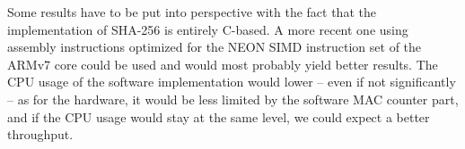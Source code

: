 Some results have to be put into perspective with the fact that the implementation of SHA-256 is entirely C-based.
A more recent one using assembly instructions optimized for the NEON SIMD instruction set of the ARMv7 core could be used and would most probably yield better results.
The CPU usage of the software implementation would lower -- even if not significantly -- as for the hardware, it would be less limited by the software MAC counter part, and if the CPU usage would stay at the same level, we could expect a better throughput.
